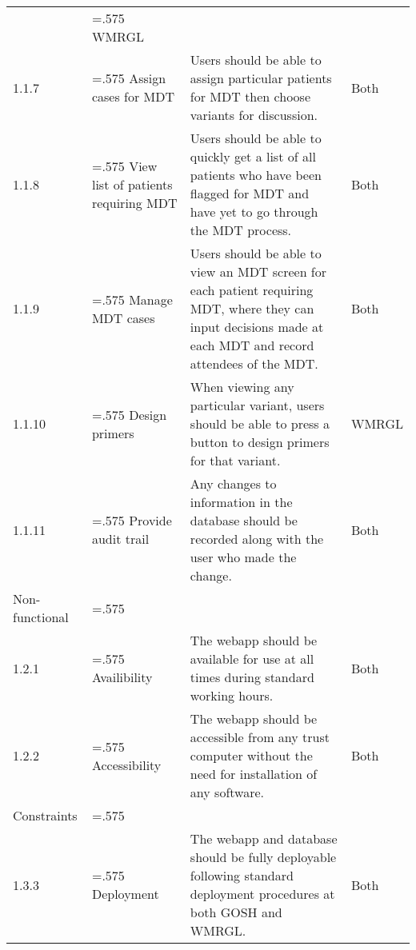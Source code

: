 \documentclass[a4paper, 10pt]{article}
\begin{document}
\begin{table}[h]
\begin{tabularx}{\textwidth}{@{}l>{\hsize=.575\hsize}X>{\hsize=1.425\hsize}Xl@{}}
        & WMRGL
        \\
        1.1.7
        & Assign cases for MDT
        & Users should be able to assign particular patients for MDT then choose variants for discussion.
        & Both
        \\
        1.1.8
        & View list of patients requiring MDT
        & Users should be able to quickly get a list of all patients who have been flagged for MDT and have yet to go through the MDT process.
        & Both
        \\
        1.1.9
        & Manage MDT cases
        & Users should be able to view an MDT screen for each patient requiring MDT, where they can input decisions made at each MDT and record attendees of the MDT.
        & Both
        \\
        1.1.10
        & Design primers
        & When viewing any particular variant, users should be able to press a button to design primers for that variant.
        & WMRGL
        \\
        1.1.11
        & Provide audit trail
        & Any changes to information in the database should be recorded along with the user who made the change.
        & Both
        \\
        \rowcolor[HTML]{C0C0C0} 
        Non-functional
        &
        &                                                                                                                           &
        \\
        1.2.1
        & Availibility
        & The webapp should be available for use at all times during standard working hours.
        & Both
        \\
        1.2.2
        & Accessibility
        & The webapp should be accessible from any trust computer without the need for installation of any software.
        & Both
        \\
        \rowcolor[HTML]{C0C0C0}
        Constraints
        &
        &                                                                                                                           &
        \\
        1.3.3
        & Deployment
        & The webapp and database should be fully deployable following standard deployment procedures at both GOSH and WMRGL.   
        & Both
        \\ 
        \bottomrule
    \end{tabularx}
\end{table}

\newpage
\end{document}
